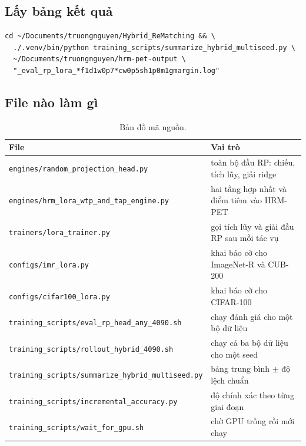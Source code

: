 \documentclass[11pt,a4paper]{article}
\begin{document}
\subsection{Lấy bảng kết quả}

\begin{footnotesize}
\begin{verbatim}
cd ~/Documents/truongnguyen/Hybrid_ReMatching && \
  ./.venv/bin/python training_scripts/summarize_hybrid_multiseed.py \
  ~/Documents/truongnguyen/hrm-pet-output \
  "_eval_rp_lora_*f1d1w0p7*cw0p5sh1p0m1gmargin.log"
\end{verbatim}
\end{footnotesize}

\subsection{File nào làm gì}

\begin{table}[htbp]
\centering
\caption{Bản đồ mã nguồn.}
\small
\begin{tabular}{@{}l>{\raggedright\arraybackslash}p{5.5cm}@{}}
\toprule
File & Vai trò \\
\midrule
\texttt{engines/random\_projection\_head.py}
  & toàn bộ đầu RP: chiếu, tích lũy, giải ridge \\
\texttt{engines/hrm\_lora\_wtp\_and\_tap\_engine.py}
  & hai tầng hợp nhất và điểm tiêm vào HRM-PET \\
\texttt{trainers/lora\_trainer.py}
  & gọi tích lũy và giải đầu RP sau mỗi tác vụ \\
\texttt{configs/imr\_lora.py}
  & khai báo cờ cho ImageNet-R và CUB-200 \\
\texttt{configs/cifar100\_lora.py}
  & khai báo cờ cho CIFAR-100 \\
\texttt{training\_scripts/eval\_rp\_head\_any\_4090.sh}
  & chạy đánh giá cho một bộ dữ liệu \\
\texttt{training\_scripts/rollout\_hybrid\_4090.sh}
  & chạy cả ba bộ dữ liệu cho một seed \\
\texttt{training\_scripts/summarize\_hybrid\_multiseed.py}
  & bảng trung bình $\pm$ độ lệch chuẩn \\
\texttt{training\_scripts/incremental\_accuracy.py}
  & độ chính xác theo từng giai đoạn \\
\texttt{training\_scripts/wait\_for\_gpu.sh}
  & chờ GPU trống rồi mới chạy \\
\bottomrule
\end{tabular}
\end{table}
\end{document}
